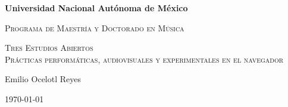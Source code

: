 \begin{titlepage}
  \begin{center}
    \centering
\vspace{1cm}
{\bfseries\LARGE Universidad Nacional Autónoma de México \par}
\vspace{1cm}
{\scshape\Large Programa de Maestría y Doctorado en Música \par}
\vspace{3cm}
       {\scshape\Huge   Tres Estudios Abiertos \\
         \large Prácticas performáticas, audiovisuales y experimentales en el navegador\par}
\vspace{3cm}
\vfill
{\Large Emilio Ocelotl Reyes \par}
\vfill
    {\Large \today \par}
    \end{center}
\end{titlepage}

